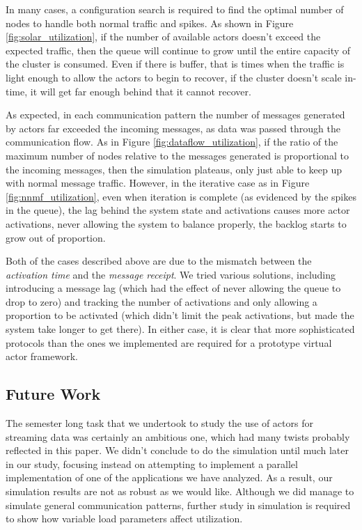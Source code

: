 \documentclass[conference,twocolumn,10pt]{IEEEtran}
\begin{document}
In many cases, a configuration search is required to find the optimal number of nodes to handle both normal traffic and spikes. As shown in Figure \ref{fig:solar_utilization}, if the number of available actors doesn't exceed the expected traffic, then the queue will continue to grow until the entire capacity of the cluster is consumed. Even if there is buffer, that is times when the traffic is light enough to allow the actors to begin to recover, if the cluster doesn't scale in-time, it will get far enough behind that it cannot recover.

As expected, in each communication pattern the number of messages generated by actors far exceeded the incoming messages, as data was passed through the communication flow. As in Figure \ref{fig:dataflow_utilization}, if the ratio of the maximum number of nodes relative to the messages generated is proportional to the incoming messages, then the simulation plateaus, only just able to keep up with normal message traffic. However, in the iterative case as in Figure \ref{fig:nnmf_utilization}, even when iteration is complete (as evidenced by the spikes in the queue), the lag behind the system state and activations causes more actor activations, never allowing the system to balance properly, the backlog starts to grow out of proportion.

Both of the cases described above are due to the mismatch between the \textit{activation time} and the \textit{message receipt}. We tried various solutions, including introducing a message lag (which had the effect of never allowing the queue to drop to zero) and tracking the number of activations and only allowing a proportion to be activated (which didn't limit the peak activations, but made the system take longer to get there). In either case, it is clear that more sophisticated protocols than the ones we implemented are required for a prototype virtual actor framework.

\subsection{Future Work}

The semester long task that we undertook to study the use of actors for streaming data was certainly an ambitious one, which had many twists probably reflected in this paper. We didn't conclude to do the simulation until much later in our study, focusing instead on attempting to implement a parallel implementation of one of the applications we have analyzed. As a result, our simulation results are not as robust as we would like. Although we did manage to simulate general communication patterns, further study in simulation is required to show how variable load parameters affect utilization.
\end{document}
